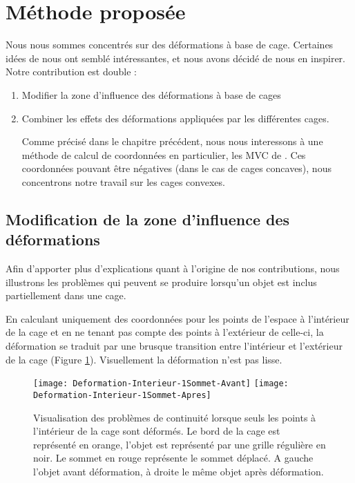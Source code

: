 \section{Méthode proposée}

Nous nous sommes concentrés sur des déformations à base de cage. Certaines
idées de \cite{GPCP13} nous ont semblé intéressantes, et nous avons décidé de
nous en inspirer. Notre contribution est double :

\begin{enumerate}

\item Modifier la zone d'influence des déformations à base de cages

\item Combiner les effets des déformations appliquées par les différentes
cages.

Comme précisé dans le chapitre précédent, nous nous interessons à une
méthode de calcul de coordonnées en particulier, les MVC de \cite{Flo03}. Ces
coordonnées pouvant être négatives (dans le cas de cages concaves), nous
concentrons notre travail sur les cages convexes.

\end{enumerate}

\subsection{Modification de la zone d'influence des déformations}

Afin d'apporter plus d'explications quant à l'origine de nos contributions,
nous illustrons les problèmes qui peuvent se produire lorsqu'un objet est
inclus partiellement dans une cage.

En calculant uniquement des coordonnées pour les points de l'espace à
l'intérieur de la cage et en ne tenant pas compte des points à l'extérieur de
celle-ci, la déformation se traduit par une brusque transition entre
l'intérieur et l'extérieur de la cage (Figure \ref{MELVI}). Visuellement la
déformation n'est pas lisse.

\begin{figure}[ht]
  \begin{center}
    \scalebox{0.2}
    {
      \texttt{[image: Deformation-Interieur-1Sommet-Avant]}
      \texttt{[image: Deformation-Interieur-1Sommet-Apres]}
    }

    \caption[Problème de continuité déformation naïve] {Visualisation des
problèmes de continuité lorsque seuls les points à l'intérieur de la cage sont
déformés. Le bord de la cage est représenté en orange, l'objet est représenté
par une grille régulière en noir. Le sommet en rouge représente le sommet
déplacé. A gauche l'objet avant déformation, à droite le même objet après
déformation.}

    \label{MELVI}
  \end{center}
\end{figure}


